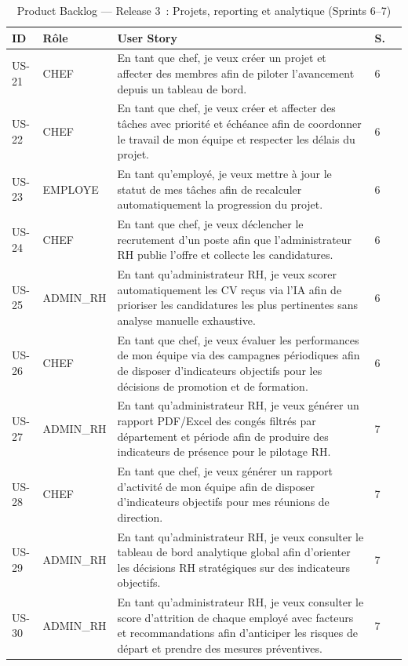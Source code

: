 \begin{table}[H]
\centering\small
\caption{Product Backlog — Release 3~: Projets, reporting et analytique (Sprints 6--7)}
\label{tab:backlog_r3}
\begin{tabularx}{\textwidth}{Vp{0.9cm}|p{1.8cm}|L|p{0.6cm}|}
\hline
\textbf{ID} & \textbf{Rôle} & \textbf{User Story} & \textbf{S.} \\
\hline
US-21 & CHEF & En tant que chef, je veux créer un projet et affecter des membres afin de piloter l’avancement depuis un tableau de bord. & 6 \\
\hline
US-22 & CHEF & En tant que chef, je veux créer et affecter des tâches avec priorité et échéance afin de coordonner le travail de mon équipe et respecter les délais du projet. & 6 \\
\hline
US-23 & EMPLOYE & En tant qu’employé, je veux mettre à jour le statut de mes tâches afin de recalculer automatiquement la progression du projet. & 6 \\
\hline
US-24 & CHEF & En tant que chef, je veux déclencher le recrutement d’un poste afin que l’administrateur RH publie l’offre et collecte les candidatures. & 6 \\
\hline
US-25 & ADMIN\_RH & En tant qu’administrateur RH, je veux scorer automatiquement les CV reçus via l’IA afin de prioriser les candidatures les plus pertinentes sans analyse manuelle exhaustive. & 6 \\
\hline
US-26 & CHEF & En tant que chef, je veux évaluer les performances de mon équipe via des campagnes périodiques afin de disposer d'indicateurs objectifs pour les décisions de promotion et de formation. & 6 \\
\hline
US-27 & ADMIN\_RH & En tant qu’administrateur RH, je veux générer un rapport PDF/Excel des congés filtrés par département et période afin de produire des indicateurs de présence pour le pilotage RH. & 7 \\
\hline
US-28 & CHEF & En tant que chef, je veux générer un rapport d’activité de mon équipe afin de disposer d’indicateurs objectifs pour mes réunions de direction. & 7 \\
\hline
US-29 & ADMIN\_RH & En tant qu’administrateur RH, je veux consulter le tableau de bord analytique global afin d’orienter les décisions RH stratégiques sur des indicateurs objectifs. & 7 \\
\hline
US-30 & ADMIN\_RH & En tant qu’administrateur RH, je veux consulter le score d’attrition de chaque employé avec facteurs et recommandations afin d’anticiper les risques de départ et prendre des mesures préventives. & 7 \\
\hline
\end{tabularx}
\end{table}

